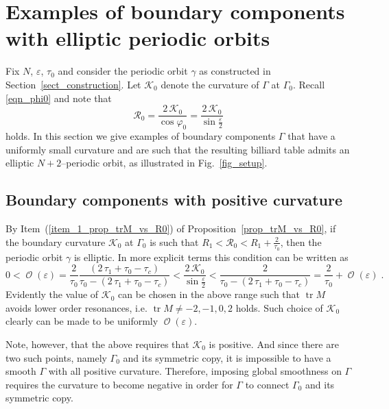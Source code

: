 \documentclass{amsart}
\theoremstyle{plain} %
\begin{document}
\section{Examples of boundary components with elliptic periodic orbits}
\label{sect_examples}

Fix $N$, $\varepsilon$, $\tau_0$ and consider the periodic orbit $\gamma$
as constructed in Section~\ref{sect_construction}.
Let ${\mathcal K}_0$ denote the curvature of $\Gamma$
at $\Gamma_0$.
Recall \eqref{eqn_phi0} and note that
\begin{equation*}
  {\mathcal R}_0
  =
  \frac{2\,{\mathcal K}_0}{\cos\varphi_0}
  =
  \frac{2\,{\mathcal K}_0}{\sin\frac{\varepsilon}{2} }
\end{equation*}
holds. In this section we give examples of boundary components
$\Gamma$ that have a uniformly small curvature
and are such that the resulting billiard table admits an
elliptic $N+2$--periodic orbit, as illustrated in Fig.~\ref{fig_setup}.



\subsection{Boundary components with positive curvature}
\label{sect_examples_pos}


By Item~(\ref{item_1_prop_trM_vs_R0}) of
Proposition~\ref{prop_trM_vs_R0}, if the boundary curvature ${\mathcal K}_0$
at $\Gamma_0$ is such that
$R_1 < {\mathcal R}_0 < R_1 + \frac{2}{\tau_0}$, then
the periodic orbit $\gamma$ is elliptic.
In more explicit terms this condition can be written as
\begin{equation*}
  0
  <
  \operatorname{\mathcal{O}}(\varepsilon)
  =
  \frac{2}{\tau_0}
  \frac{
  (2\,\tau_1 + \tau_0 - \tau_c)
  }{
  \tau_0
  -
  (2\,\tau_1 + \tau_0 - \tau_c)
  }
  <
  \frac{2\,{\mathcal K}_0}{\sin\frac{\varepsilon}{2} }
  <
  \frac{2}{ \tau_0 - (2\,\tau_1 + \tau_0 - \tau_c) }
  =
  \frac{2}{ \tau_0 } + \operatorname{\mathcal{O}}(\varepsilon)
  \;.
\end{equation*}
Evidently the value of ${\mathcal K}_0$ can be chosen
in the above range such that $\operatorname{tr} M$ avoids lower
order resonances, i.e.
$\operatorname{tr} M \neq -2, -1, 0, 2$ holds.
Such choice of ${\mathcal K}_0$ clearly can be made
to be uniformly $\operatorname{\mathcal{O}}(\varepsilon)$.

Note, however, that the above requires that ${\mathcal K}_0$
is positive. And since there are two such points, namely
$\Gamma_0$ and its symmetric copy, it is impossible
to have a smooth $\Gamma$ with all positive curvature.
Therefore, imposing global smoothness on $\Gamma$
requires the curvature to become negative in order for $\Gamma$
to connect $\Gamma_0$ and its symmetric copy.
\end{document}
